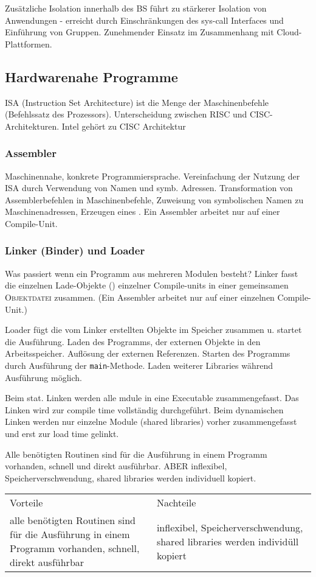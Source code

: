 Zusätzliche Isolation innerhalb des BS führt zu stärkerer Isolation von Anwendungen - erreicht durch Einschränkungen des sys-call Interfaces und Einführung von Gruppen. Zunehmender Einsatz im Zusammenhang mit Cloud-Plattformen. 

\subsection{Hardwarenahe Programme}
ISA (Instruction Set Architecture) ist die Menge der Maschinenbefehle (Befehlssatz des Prozessors). Unterscheidung zwischen RISC und CISC-Architekturen. Intel gehört zu CISC Architektur

\subsubsection{Assembler}
Maschinennahe, konkrete Programmiersprache. Vereinfachung der Nutzung der ISA durch Verwendung von Namen und symb. Adressen. 
Transformation von Assemblerbefehlen in Maschinenbefehle, Zuweisung von symbolischen Namen zu Maschinenadressen, Erzeugen eines . Ein Assembler arbeitet nur auf einer Compile-Unit. 

\subsubsection{Linker (Binder) und Loader}
Was passiert wenn ein Programm aus mehreren Modulen besteht?
Linker fasst die einzelnen Lade-Objekte () einzelner Compile-units in einer gemeinsamen \textsc{Objektdatei} zusammen. (Ein Assembler arbeitet nur auf einer einzelnen Compile-Unit.) 

Loader fügt die vom Linker erstellten Objekte im Speicher zusammen u. startet die Ausführung. Laden des Programms, der externen Objekte in den Arbeitsspeicher. Auflösung der externen Referenzen. Starten des Programms durch Ausführung der \texttt{main}-Methode. Laden weiterer Libraries während Ausführung möglich. 

Beim stat. Linken werden alle mdule in eine Executable zusammengefasst. Das Linken wird zur compile time vollständig durchgeführt. Beim dynamischen Linken werden nur einzelne Module (shared libraries) vorher zusammengefasst und erst zur load time gelinkt. 

Alle benötigten Routinen sind für die Ausführung in einem Programm vorhanden, schnell und direkt ausführbar. ABER inflexibel, Speicherverschwendung, shared libraries werden individuell kopiert. 

\begin{tabularx}{\textwidth}{X X}
	Vorteile& Nachteile\\
	alle benötigten Routinen sind für die Ausführung in einem Programm vorhanden, schnell, direkt ausführbar& inflexibel, Speicherverschwendung, shared libraries werden individüll kopiert\\ 
\end{tabularx}
